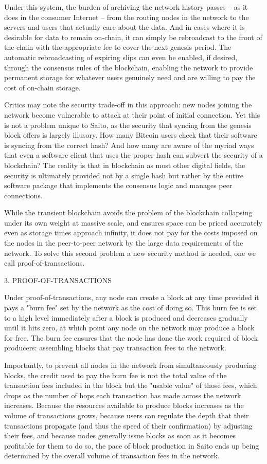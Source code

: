 \documentclass[11.5pt, oneside]{article}   	%
\begin{document}
\begin{multicols}{2}
Under this system, the burden of archiving the network history passes -- as it does in the consumer Internet -- from the routing nodes in the network to the servers and users that actually care about the data. And in cases where it is desirable for data to remain on-chain, it can simply be rebroadcast to the front of the chain with the appropriate fee to cover the next genesis period. The automatic rebroadcasting of expiring slips can even be enabled, if desired, through the consensus rules of the blockchain, enabling the network to provide permanent storage for whatever users genuinely need and are willing to pay the cost of on-chain storage.

Critics may note the security trade-off in this approach: new nodes joining the network become vulnerable to attack at their point of initial connection. Yet this is not a problem unique to Saito, as the security that syncing from the genesis block offers is largely illusory. How many Bitcoin users check that their software is syncing from the correct hash? And how many are aware of the myriad ways that even a software client that uses the proper hash can subvert the security of a blockchain? The reality is that in blockchain as most other digital fields, the security is ultimately provided not by a single hash but rather by the entire software package that implements the consensus logic and manages peer connections.

While the transient blockchain avoids the problem of the blockchain collapsing under its own weight at massive scale, and ensures space can be priced accurately even as storage times approach infinity, it does not pay for the costs imposed on the nodes in the peer-to-peer network by the large data requirements of the network. To solve this second problem a new security method is needed, one we call proof-of-transactions.

3. PROOF-OF-TRANSACTIONS

Under proof-of-transactions, any node can create a block at any time provided it pays a "burn fee" set by the network as the cost of doing so. This burn fee is set to a high level immediately after a block is produced and decreases gradually until it hits zero, at which point any node on the network may produce a block for free. The burn fee ensures that the node has done the work required of block producers: assembling blocks that pay transaction fees to the network. 

Importantly, to prevent all nodes in the network from simultaneously producing blocks, the credit used to pay the burn fee is not the total value of the transaction fees included in the block but the "usable value" of those fees, which drops as the number of hops each transaction has made across the network increases. Because the resources available to produce blocks increases as the volume of transactions grows, because users can regulate the depth that their transactions propagate (and thus the speed of their confirmation) by adjusting their fees, and because nodes generally issue blocks as soon as it becomes profitable for them to do so, the pace of block production in Saito ends up being determined by the overall volume of transaction fees in the network.


\end{multicols}
\end{document}
